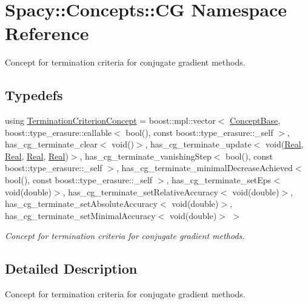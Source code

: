 \hypertarget{namespaceSpacy_1_1Concepts_1_1CG}{}\section{Spacy\+:\+:Concepts\+:\+:C\+G Namespace Reference}
\label{namespaceSpacy_1_1Concepts_1_1CG}


Concept for termination criteria for conjugate gradient methods.  


\subsection*{Typedefs}
\begin{DoxyCompactItemize}
\item 
using \hyperlink{group__CGConceptGroup_ga6b30d103c365816efcfb038d922aef07_ga6b30d103c365816efcfb038d922aef07}{Termination\+Criterion\+Concept} = boost\+::mpl\+::vector$<$ \hyperlink{group__ConceptGroup_ga63426675cc05ccce03ead56a4fa90d96_ga63426675cc05ccce03ead56a4fa90d96}{Concept\+Base}, boost\+::type\+\_\+erasure\+::callable$<$ bool(), const boost\+::type\+\_\+erasure\+::\+\_\+self $>$, has\+\_\+cg\+\_\+terminate\+\_\+clear$<$ void()$>$, has\+\_\+cg\+\_\+terminate\+\_\+update$<$ void(\hyperlink{classSpacy_1_1Real}{Real}, \hyperlink{classSpacy_1_1Real}{Real}, \hyperlink{classSpacy_1_1Real}{Real}, \hyperlink{classSpacy_1_1Real}{Real})$>$, has\+\_\+cg\+\_\+terminate\+\_\+vanishing\+Step$<$ bool(), const boost\+::type\+\_\+erasure\+::\+\_\+self $>$, has\+\_\+cg\+\_\+terminate\+\_\+minimal\+Decrease\+Achieved$<$ bool(), const boost\+::type\+\_\+erasure\+::\+\_\+self $>$, has\+\_\+cg\+\_\+terminate\+\_\+set\+Eps$<$ void(double)$>$, has\+\_\+cg\+\_\+terminate\+\_\+set\+Relative\+Accuracy$<$ void(double)$>$, has\+\_\+cg\+\_\+terminate\+\_\+set\+Absolute\+Accuracy$<$ void(double)$>$, has\+\_\+cg\+\_\+terminate\+\_\+set\+Minimal\+Accuracy$<$ void(double)$>$ $>$
\begin{DoxyCompactList}\small\item\em Concept for termination criteria for conjugate gradient methods. \end{DoxyCompactList}\end{DoxyCompactItemize}


\subsection{Detailed Description}
Concept for termination criteria for conjugate gradient methods. 

